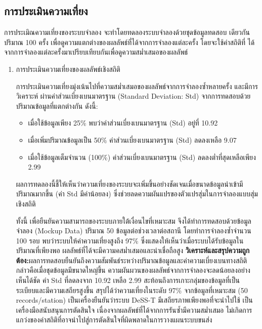 \subsection{การประเมินความเที่ยง}
\begin{mypara}
    \indent การประเมิณความเที่ยงของระบบจำลอง จะทำโดยทดลองระบบจำลองด้วยชุดข้อมูลทดสอบ
    เดียวกันปริมาณ 100 ครั้ง เพื่อดูความแตกต่างของผลลัพธ์ที่ได้จากการจำลองแต่ละครั้ง โดยจะใช้ค่าสถิติที่
    ได้จากการจำลองแต่ละครั้งมาเปรียบเทียบกันเพื่อดูความสม่ำเสมอของผลลัพธ์
\end{mypara}
\begin{enumerate}
    \item การประเมินความเที่ยงของผลลัพธ์เชิงสถิติ
            \begin{mypara}
                \indent การประเมินความเที่ยงมุ่งเน้นไปที่ความสม่ำเสมอของผลลัพธ์จากการจำลองซ้ำหลายครั้ง และมีการวิเคราะห์
                ผ่านค่าส่วนเบี่ยงเบนมาตรฐาน (Standard Deviation: Std) จากการทดสอบด้วยปริมาณข้อมูลที่แตกต่างกัน ดังนี้:
                \begin{itemize}
                    \item เมื่อใช้ข้อมูลเพียง 25\% พบว่าค่าส่วนเบี่ยงเบนมาตรฐาน (Std) อยู่ที่ 10.92
                    \item เมื่อเพิ่มปริมาณข้อมูลเป็น 50\% ค่าส่วนเบี่ยงเบนมาตรฐาน (Std) ลดลงเหลือ 9.07
                    \item เมื่อใช้ข้อมูลเต็มจำนวน (100\%) ค่าส่วนเบี่ยงเบนมาตรฐาน (Std) ลดลงต่ำที่สุดเหลือเพียง 2.99
                \end{itemize}
                \indent ผลการทดลองนี้ชี้ให้เห็นว่าความเที่ยงของระบบจะเพิ่มขึ้นอย่างชัดเจนเมื่อขนาดข้อมูลนำเข้ามีปริมาณมากขึ้น (ค่า Std มีค่าน้อยลง) 
                ซึ่งช่วยลดความผันแปรของตัวแปรสุ่มในการจำลองแบบสุ่มเชิงสถิติ

                \indent ทั้งนี้ เพื่อยืนยันความสามารถของระบบภายใต้เงื่อนไขที่เหมาะสม จึงได้ทำการทดสอบด้วยข้อมูลจำลอง (Mockup Data) 
                ปริมาณ 50 ข้อมูลต่อช่วงเวลาต่อสถานี โดยทำการจำลองซ้ำจำนวน 100 รอบ พบว่าระบบให้ค่าความเที่ยงสูงถึง 97\% 
                ซึ่งแสดงให้เห็นว่าเมื่อระบบได้รับข้อมูลในปริมาณที่เพียงพอ ผลลัพธ์ที่ได้จะมีความคสม่ำเสมอและน่าเชื่อถือสูง
                \textbf{วิเคราะห์และสรุปความถูกต้อง:}ผลการทดสอบยืนยันถึงความสัมพันธ์ระหว่างปริมาณข้อมูลและค่าความเบี่ยงเบนทางสถิติ 
                กล่าวคือเมื่อชุดข้อมูลมีขนาดใหญ่ขึ้น ความผันผวนของผลลัพธ์จากการจำลองจะลดน้อยลงอย่างเห็นได้ชัด ค่า Std ที่ลดลงจาก 10.92 
                เหลือ 2.99 สะท้อนถึงการเกาะกลุ่มของข้อมูลที่เป็นระเบียบและมีความเสถียรสูงขึ้น สรุปได้ว่าความเที่ยงในระดับ 97\% 
                จากข้อมูลที่เหมาะสม (50 records/station) เป็นเครื่องยืนยันว่าระบบ DeSS-T มีเสถียรภาพเพียงพอที่จะนำไปใช้
                เป็นเครื่องมือสนับสนุนการตัดสินใจ เนื่องจากผลลัพธ์ที่ได้จากการรันซ้ำมีความสม่ำเสมอ 
                ไม่เกิดการแกว่งของค่าสถิติที่อาจนำไปสู่การตัดสินใจที่ผิดพลาดในการวางแผนระบบขนส่ง
            \end{mypara}
\end{enumerate}
